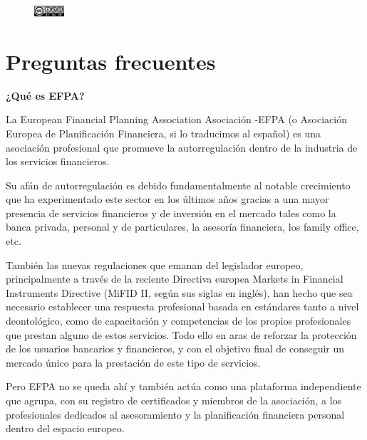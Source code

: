 \documentclass[
  letterpaper,
  DIV=11,
  numbers=noendperiod]{scrreprt}
\begin{document}
\begin{figure}

\includegraphics[width=0.1\textwidth,height=\textheight]{./images/by-nc-sa.png} \hfill{}

\end{figure}


\hypertarget{preguntas-frecuentes}{%
\chapter*{Preguntas frecuentes}\label{preguntas-frecuentes}}


\textbf{¿Qué es EFPA?}

La European Financial Planning Association Asociación -EFPA (o
Asociación Europea de Planificación Financiera, si lo traducimos al
español) es una asociación profesional que promueve la autorregulación
dentro de la industria de los servicios financieros.

Su afán de autorregulación es debido fundamentalmente al notable
crecimiento que ha experimentado este sector en los últimos años gracias
a una mayor presencia de servicios financieros y de inversión en el
mercado tales como la banca privada, personal y de particulares, la
asesoría financiera, los family office, etc.

También las nuevas regulaciones que emanan del legislador europeo,
principalmente a través de la reciente Directiva europea Markets in
Financial Instruments Directive (MiFID II, según sus siglas en inglés),
han hecho que sea necesario establecer una respuesta profesional basada
en estándares tanto a nivel deontológico, como de capacitación y
competencias de los propios profesionales que prestan alguno de estos
servicios. Todo ello en aras de reforzar la protección de los usuarios
bancarios y financieros, y con el objetivo final de conseguir un mercado
único para la prestación de este tipo de servicios.

Pero EFPA no se queda ahí y también actúa como una plataforma
independiente que agrupa, con su registro de certificados y miembros de
la asociación, a los profesionales dedicados al asesoramiento y la
planificación financiera personal dentro del espacio europeo.
\end{document}
